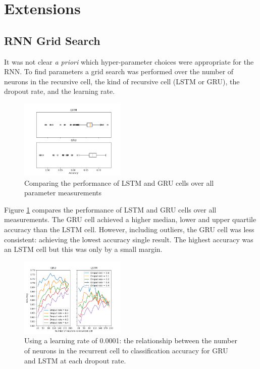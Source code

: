 \section{Extensions}
\label{sec:extensions}

  \subsection{RNN Grid Search}
  \label{sec:rnn_grid_search}

    It was not clear \textit{a priori} which hyper-parameter choices were
    appropriate for the RNN. To find parameters a grid search was performed over
    the number of neurons in the recursive cell, the kind of recursive cell
    (LSTM or GRU), the dropout rate, and the learning rate.

    \begin{figure}[ht]
      \includegraphics[width=0.45\textwidth]{Figures/lstm_gru_plot.png}
      \caption{Comparing the performance of LSTM and GRU cells over all
        parameter measurements}
      \label{fig:lstm_gru}
    \end{figure}

    Figure \ref{fig:lstm_gru} compares the performance of LSTM and GRU cells
    over all measurements. The GRU cell achieved a higher
    median, lower and upper quartile accuracy than the LSTM cell. However, including
    outliers, the GRU cell was less consistent: achieving the lowest accuracy
    single result. The highest accuracy was an LSTM cell but this was only by a
    small margin.

    \begin{figure}[ht]
      \includegraphics[width=0.45\textwidth]{Figures/n_neurons_plot-0-0001.png}
      \caption{Using a learning rate of 0.0001: the relationship between the number of neurons in the recurrent
        cell to classification accuracy for GRU and LSTM at each dropout rate.}
      \label{fig:learn_rate_0.0001}
    \end{figure}

